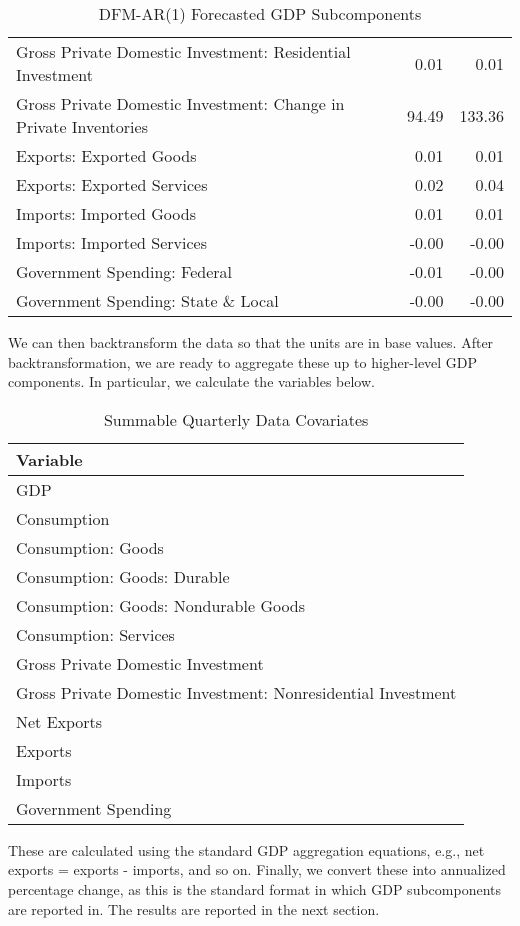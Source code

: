 \documentclass[11pt, letterpaper]{article}\usepackage[]{graphicx}\usepackage[]{color}
\begin{document}
\begin{table}[H]
\begin{tabular}{lrr}
  Gross Private Domestic Investment: Residential Investment & 0.01 & 0.01 \\ 
  Gross Private Domestic Investment: Change in Private Inventories & 94.49 & 133.36 \\ 
  Exports: Exported Goods & 0.01 & 0.01 \\ 
  Exports: Exported Services & 0.02 & 0.04 \\ 
  Imports: Imported Goods & 0.01 & 0.01 \\ 
  Imports: Imported Services & -0.00 & -0.00 \\ 
  Government Spending: Federal & -0.01 & -0.00 \\ 
  Government Spending: State \& Local & -0.00 & -0.00 \\ 
   \hline
\end{tabular}
\endgroup
\caption{DFM-AR(1) Forecasted GDP Subcomponents} 
\end{table}


We can then backtransform the data so that the units are in base values. After backtransformation, we are ready to aggregate these up to higher-level GDP components. In particular, we calculate the variables below.
\begin{table}[H]
\centering
\begingroup\scriptsize
\begin{tabular}{l}
  \hline
Variable \\ 
  \hline
GDP \\ 
  Consumption \\ 
  Consumption: Goods \\ 
  Consumption: Goods: Durable \\ 
  Consumption: Goods: Nondurable Goods \\ 
  Consumption: Services \\ 
  Gross Private Domestic Investment \\ 
  Gross Private Domestic Investment: Nonresidential Investment \\ 
  Net Exports \\ 
  Exports \\ 
  Imports \\ 
  Government Spending \\ 
   \hline
\end{tabular}
\endgroup
\caption{Summable Quarterly Data Covariates} 
\end{table}

These are calculated using the standard GDP aggregation equations, e.g., net exports = exports - imports, and so on.
Finally, we convert these into annualized percentage change, as this is the standard format in which GDP subcomponents are reported in. The results are reported in the next section.
\end{document}
